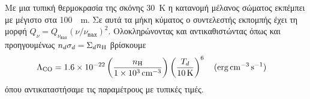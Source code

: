 Με μια τυπική θερμοκρασία της σκόνης \SI{30}{K} η κατανομή μέλανος σώματος εκπέμπει με μέγιστο στα \SI{100}{\mu m}. Σε αυτά τα μήκη κύματος ο συντελεστής εκπομπής έχει τη μορφή $Q_\nu=Q_{\nu _\mathtt{max}} (\nu / \nu _\mathtt{max})^2$.
Ολοκληρώνοντας και αντικαθιστώντας όπως και προηγουμένως $n_d \sigma _d = \Sigma _d n_{\ce{H}}$ βρίσκουμε
\begin{equation}
\Lambda _{\ce{CO}}=\num{1.6e-22} \left( \frac{n_{\ce{H}}}{\SI{1e3}{cm^{-3}}} \right) 
\left( \frac{T_d}{\SI{10}{K}} \right)^6  \qq{(\si{erg.cm^{-3}.s^{-1}})} 
\end{equation}
όπου αντικαταστήσαμε τις παραμέτρους με τυπικές τιμές.

%
%
